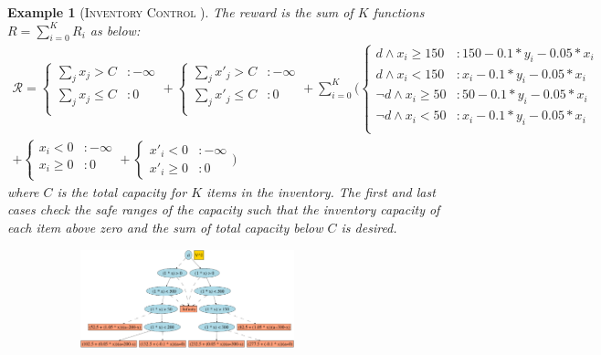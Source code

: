 \documentclass[twoside,11pt]{article}
\newcommand{\InventoryControl}{\textsc{Inventory Control }}
\newtheorem*{example*}{Example}
\begin{document}
\begin{example*} [\InventoryControl]
The reward is the sum of $K$ functions $R = \sum_{i=0}^K R_i $ as below:
{\footnotesize
\begin{align}
\mathcal{R} =
\begin{cases}
\sum_{j} x_j > C &: -\infty  \\	
\sum_{j} x_j \leq C &:0\\  
\end{cases} 
+ 
\begin{cases}
\sum_{j} x'_j > C &: -\infty 	\\
\sum_{j} x'_j \leq C &: 0 	\\
\end{cases}
+
\sum_{i=0}^K \Bigg( \begin{cases}
d \wedge x_i \geq 150&: 150 - 0.1 * y_i - 0.05 * x_i \\
d \wedge x_i < 150 &:   x_i - 0.1 * y_i - 0.05 * x_i \\
\neg d \wedge x_i \geq 50 &: 50 - 0.1 * y_i - 0.05 * x_i  \\
\neg d \wedge x_i < 50 &: x_i - 0.1 * y_i - 0.05 * x_i  \\
\end{cases}\nonumber\\
+
\begin{cases}
x_i < 0 &: -\infty  \\	
x_i \geq 0 &:0\\
\end{cases} 
+ 
\begin{cases}
x'_i < 0&: -\infty  \\
x'_i \geq 0 &: 0
\end{cases} \Bigg)
\label{rew_inv}
\end{align}}
where $C$ is the total capacity for $K$ items in the inventory. The first and last cases check the safe ranges of the capacity such that the inventory capacity of each item above zero and the sum of total capacity below $C$ is desired.
\begin{figure}[t!]
\centering
\begin{subfigure}
                \centering
                \includegraphics[width=0.68\textwidth]{pics/inv-v2.pdf}

\end{subfigure}
\end{figure}
\end{example*}
\end{document}
